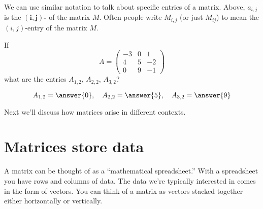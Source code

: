 \documentclass{ximera}
\begin{document}
We can use similar notation to talk about specific entries of a
matrix. Above, $a_{i,j}$ is the $\boldsymbol{(i,j)}${\bf-}
of the matrix $M$. Often people write $M_{i,j}$ (or just $M_{ij}$) to
mean the $(i,j)$-entry of the matrix $M$.



\begin{question}
  If
  \[A= \begin{pmatrix}
  -3 & 0 & 1\\
  4 & 5 & -2\\
  0 & 9 & -1
  \end{pmatrix}
  \]
  what are the entries $A_{1,2}$, $A_{2,2}$, $A_{3,2}$?
  \begin{prompt}
    \[
    A_{1,2} = \answer{0}, \quad A_{2,2} = \answer{5}, \quad A_{3,2} = \answer{9}
    \]
  \end{prompt}
\end{question}

Next we'll discuss how matrices arise in different contexts.


\section{Matrices store data}


A matrix can be thought of as a ``mathematical spreadsheet.'' With a
spreadsheet you have rows and columns of data.  The data we're
typically interested in comes in the form of vectors.  You can think
of a matrix as vectors stacked together either horizontally or
vertically.
\end{document}
